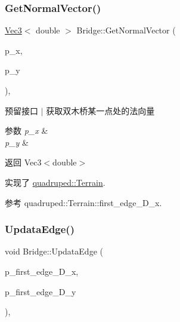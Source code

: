 \subsubsection{\texorpdfstring{Get\+Normal\+Vector()}{GetNormalVector()}}
{\footnotesize\ttfamily \hyperlink{cppTypes_8h_a65c27bf97693676535dd0b30ea0ad399}{Vec3}$<$ double $>$ Bridge\+::\+Get\+Normal\+Vector (\begin{DoxyParamCaption}\item[{double}]{p\+\_\+x,  }\item[{double}]{p\+\_\+y }\end{DoxyParamCaption})\hspace{0.3cm}{\ttfamily [override]}, {\ttfamily [virtual]}}



预留接口 $\vert$ 获取双木桥某一点处的法向量 


\begin{DoxyParams}{参数}
{\em p\+\_\+x} & \\
\hline
{\em p\+\_\+y} & \\
\hline
\end{DoxyParams}
\begin{DoxyReturn}{返回}
Vec3$<$double$>$ 
\end{DoxyReturn}


实现了 \hyperlink{classquadruped_1_1Terrain}{quadruped\+::\+Terrain}.



参考 quadruped\+::\+Terrain\+::first\+\_\+edge\+\_\+\+D\+\_\+x.

\mbox{\label{classquadruped_1_1Bridge_a6919abf7851a9dabacad2cf3af75ed5e}} 
\subsubsection{\texorpdfstring{Updata\+Edge()}{UpdataEdge()}}
{\footnotesize\ttfamily void Bridge\+::\+Updata\+Edge (\begin{DoxyParamCaption}\item[{double}]{p\+\_\+first\+\_\+edge\+\_\+\+D\+\_\+x,  }\item[{double}]{p\+\_\+first\+\_\+edge\+\_\+\+D\+\_\+y }\end{DoxyParamCaption})\hspace{0.3cm}{\ttfamily [override]}, {\ttfamily [virtual]}}



